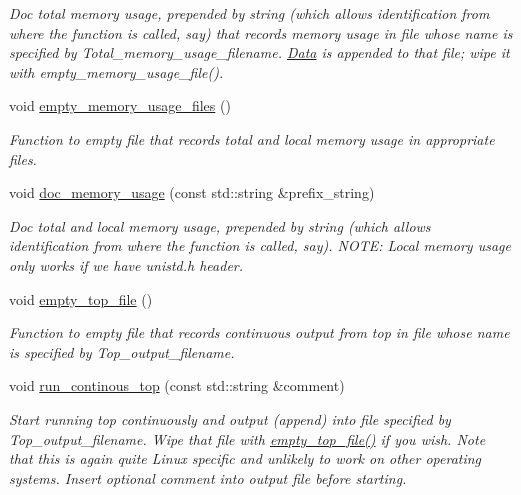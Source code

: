 \begin{DoxyCompactItemize}
\begin{DoxyCompactList}\small\item\em Doc total memory usage, prepended by string (which allows identification from where the function is called, say) that records memory usage in file whose name is specified by Total\+\_\+memory\+\_\+usage\+\_\+filename. \hyperlink{classoomph_1_1Data}{Data} is appended to that file; wipe it with empty\+\_\+memory\+\_\+usage\+\_\+file(). \end{DoxyCompactList}\item 
void \hyperlink{namespaceoomph_1_1MemoryUsage_a47bde23694eeafe80bdcffb3aaeb07a5}{empty\+\_\+memory\+\_\+usage\+\_\+files} ()
\begin{DoxyCompactList}\small\item\em Function to empty file that records total and local memory usage in appropriate files. \end{DoxyCompactList}\item 
void \hyperlink{namespaceoomph_1_1MemoryUsage_aa714e9e49de96f4ca6a9fd7ae99dbeab}{doc\+\_\+memory\+\_\+usage} (const std\+::string \&prefix\+\_\+string)
\begin{DoxyCompactList}\small\item\em Doc total and local memory usage, prepended by string (which allows identification from where the function is called, say). N\+O\+TE\+: Local memory usage only works if we have unistd.\+h header. \end{DoxyCompactList}\item 
void \hyperlink{namespaceoomph_1_1MemoryUsage_a0034019640ac5f6ffe7e8e40fae1e453}{empty\+\_\+top\+\_\+file} ()
\begin{DoxyCompactList}\small\item\em Function to empty file that records continuous output from top in file whose name is specified by Top\+\_\+output\+\_\+filename. \end{DoxyCompactList}\item 
void \hyperlink{namespaceoomph_1_1MemoryUsage_a53c2afeb4ffd85dd771ace27fcb84136}{run\+\_\+continous\+\_\+top} (const std\+::string \&comment)
\begin{DoxyCompactList}\small\item\em Start running top continuously and output (append) into file specified by Top\+\_\+output\+\_\+filename. Wipe that file with \hyperlink{namespaceoomph_1_1MemoryUsage_a0034019640ac5f6ffe7e8e40fae1e453}{empty\+\_\+top\+\_\+file()} if you wish. Note that this is again quite Linux specific and unlikely to work on other operating systems. Insert optional comment into output file before starting. \end{DoxyCompactList}\item 

\end{DoxyCompactItemize}
